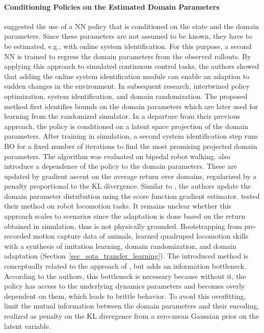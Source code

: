 \documentclass[utf8]{frontiersSCNS} %
\begin{document}
\paragraph*{Conditioning Policies on the Estimated Domain Parameters}
\citet{Yu_Turk_17} suggested the use of a \ac{NN} policy that is conditioned on the state and the domain parameters.
Since these parameters are not assumed to be known, they have to be estimated, e.g., with online system identification.
For this purpose, a second \ac{NN} is trained to regress the domain parameters from the observed rollouts. 
By applying this approach to simulated continuous control tasks, the authors showed that adding the online system identification module can enable an adaption to sudden changes in the environment.
%
In subsequent research, \citet{Yu_Liu_19} intertwined policy optimization, system identification, and domain randomization.
The proposed method first identifies bounds on the domain parameters which are later used for learning from the randomized simulator.
In a departure from their previous approach, the policy is conditioned on a latent space projection of the domain parameters.
After training in simulation, a second system identification step runs \ac{BO} for a fixed number of iterations to find the most promising projected domain parameters.
The algorithm was evaluated on \simtoreal bipedal robot walking.
%
\citet{Mozifian_Dudek_20} also introduce a dependence of the policy \wrt to the domain parameters.
These are updated by gradient ascent on the average return over domains, regularized by a penalty proportional to the \ac{KL} divergence.
Similar to \citet{Ruiz_Chandraker_19}, the authors update the domain parameter distribution using the score function gradient estimator.
\citet{Mozifian_Dudek_20} tested their method on \simtosim robot locomotion tasks.
It remains unclear whether this approach scales to \simtoreal scenarios since the adaptation is done based on the return obtained in simulation, thus is not physically grounded.
%
Bootstrapping from pre-recorded motion capture data of animals, \citet{Peng_Levine_20} learned quadruped locomotion skills with a synthesis of imitation learning, domain randomization, and domain adaptation (Section~\ref{sec_sota_transfer_learning}).
The introduced method is conceptually related to the approach of \citet{Yu_Turk_19}, but adds an information bottleneck.
%
%
According to the authors, this bottleneck is necessary because without it, the policy has access to the underlying dynamics parameters and becomes overly dependent on them, which leads to brittle behavior.
To avoid this overfitting, \citet{Peng_Levine_20} limit the mutual information between the domain parameters and their encoding, realized as penalty on the \ac{KL} divergence from a zero-mean Gaussian prior on the latent variable.
\end{document}
